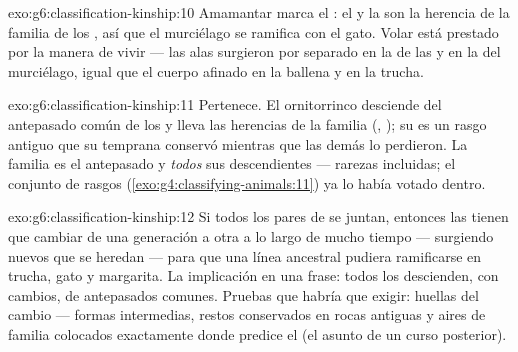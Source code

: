 \begin{solution}{exo:g6:classification-kinship:10}
Amamantar marca el : el  y la  son la herencia de la
familia de los , así que el murciélago se ramifica con el
gato. Volar está prestado por la manera de vivir --- las alas surgieron
por separado en la  de las  y en la del murciélago, igual que
el cuerpo afinado en la ballena y en la trucha.
\end{solution}

\begin{solution}{exo:g6:classification-kinship:11}
Pertenece. El ornitorrinco desciende del antepasado común de los
 y lleva las herencias de la familia (, ); su 
es un rasgo antiguo que su  temprana conservó mientras que las
demás lo perdieron. La familia es el antepasado y \emph{todos} sus
descendientes --- rarezas incluidas; el conjunto de rasgos
(\cref{exo:g4:classifying-animals:11}) ya lo había votado dentro.
\end{solution}

\begin{solution}{exo:g6:classification-kinship:12}
Si todos los pares de  se juntan, entonces las  tienen que
cambiar de una generación a otra a lo largo de mucho tiempo ---
surgiendo  nuevos que se heredan --- para que una línea
ancestral pudiera ramificarse en trucha, gato y margarita. La
implicación en una frase: todos los  descienden, con
cambios, de antepasados comunes. Pruebas que habría que exigir: huellas
del cambio --- formas intermedias, restos conservados en rocas antiguas
y aires de familia colocados exactamente donde predice el  (el
asunto de un curso posterior).
\end{solution}

